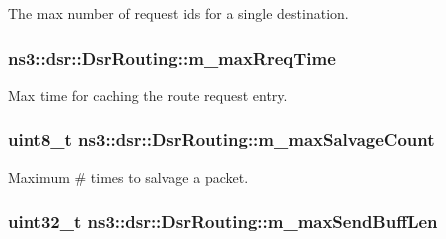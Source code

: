 The max number of request ids for a single destination. 

\subsubsection[{\texorpdfstring{m\+\_\+max\+Rreq\+Time}{m_maxRreqTime}}]{ ns3\+::dsr\+::\+Dsr\+Routing\+::m\+\_\+max\+Rreq\+Time\hspace{0.3cm}{\ttfamily [private]}}\hypertarget{classns3_1_1dsr_1_1DsrRouting_a8f44b1800a0eff487b8490c65cee2d0a}{}\label{classns3_1_1dsr_1_1DsrRouting_a8f44b1800a0eff487b8490c65cee2d0a}


Max time for caching the route request entry. 

\subsubsection[{\texorpdfstring{m\+\_\+max\+Salvage\+Count}{m_maxSalvageCount}}]{\setlength{\rightskip}{0pt plus 5cm}uint8\+\_\+t ns3\+::dsr\+::\+Dsr\+Routing\+::m\+\_\+max\+Salvage\+Count\hspace{0.3cm}{\ttfamily [private]}}\hypertarget{classns3_1_1dsr_1_1DsrRouting_a89f7e66d9f1bd83433b004876acf4a45}{}\label{classns3_1_1dsr_1_1DsrRouting_a89f7e66d9f1bd83433b004876acf4a45}


Maximum \# times to salvage a packet. 

\subsubsection[{\texorpdfstring{m\+\_\+max\+Send\+Buff\+Len}{m_maxSendBuffLen}}]{\setlength{\rightskip}{0pt plus 5cm}uint32\+\_\+t ns3\+::dsr\+::\+Dsr\+Routing\+::m\+\_\+max\+Send\+Buff\+Len\hspace{0.3cm}{\ttfamily [private]}}\hypertarget{classns3_1_1dsr_1_1DsrRouting_a5cf78026e2a25a4468c04745f4a10c13}{}\label{classns3_1_1dsr_1_1DsrRouting_a5cf78026e2a25a4468c04745f4a10c13}


